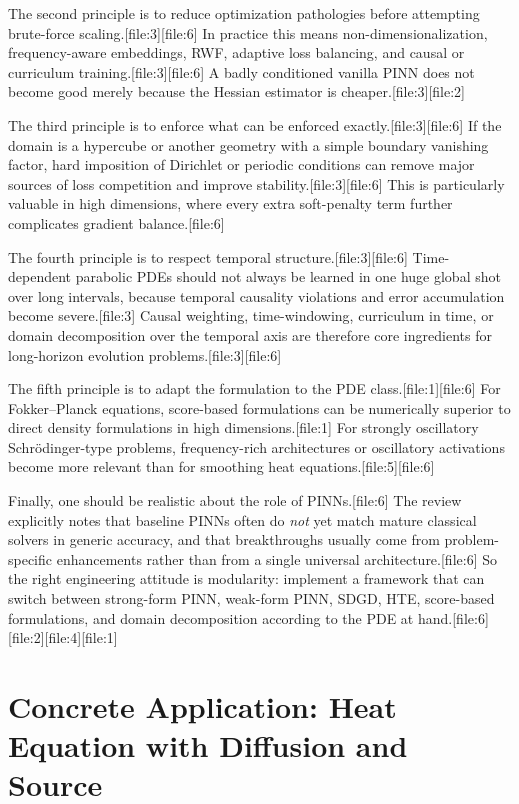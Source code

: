 \documentclass[11pt]{report}
\begin{document}
The second principle is to reduce optimization pathologies before attempting brute-force scaling.[file:3][file:6]  
In practice this means non-dimensionalization, frequency-aware embeddings, RWF, adaptive loss balancing, and causal or curriculum training.[file:3][file:6]  
A badly conditioned vanilla PINN does not become good merely because the Hessian estimator is cheaper.[file:3][file:2]

The third principle is to enforce what can be enforced exactly.[file:3][file:6]  
If the domain is a hypercube or another geometry with a simple boundary vanishing factor, hard imposition of Dirichlet or periodic conditions can remove major sources of loss competition and improve stability.[file:3][file:6]  
This is particularly valuable in high dimensions, where every extra soft-penalty term further complicates gradient balance.[file:6]

The fourth principle is to respect temporal structure.[file:3][file:6]  
Time-dependent parabolic PDEs should not always be learned in one huge global shot over long intervals, because temporal causality violations and error accumulation become severe.[file:3]  
Causal weighting, time-windowing, curriculum in time, or domain decomposition over the temporal axis are therefore core ingredients for long-horizon evolution problems.[file:3][file:6]

The fifth principle is to adapt the formulation to the PDE class.[file:1][file:6]  
For Fokker--Planck equations, score-based formulations can be numerically superior to direct density formulations in high dimensions.[file:1]  
For strongly oscillatory Schr\"odinger-type problems, frequency-rich architectures or oscillatory activations become more relevant than for smoothing heat equations.[file:5][file:6]

Finally, one should be realistic about the role of PINNs.[file:6]  
The review explicitly notes that baseline PINNs often do \emph{not} yet match mature classical solvers in generic accuracy, and that breakthroughs usually come from problem-specific enhancements rather than from a single universal architecture.[file:6]  
So the right engineering attitude is modularity: implement a framework that can switch between strong-form PINN, weak-form PINN, SDGD, HTE, score-based formulations, and domain decomposition according to the PDE at hand.[file:6][file:2][file:4][file:1]

\chapter{Concrete Application: Heat Equation with Diffusion and Source}
\end{document}
